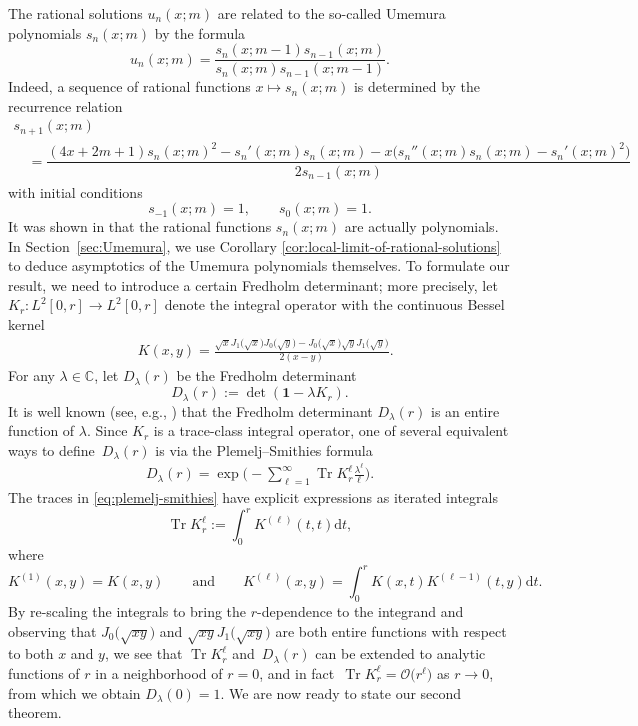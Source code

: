 \documentclass[pdftex]{sigma}
\numberwithin{equation}{section}
\newcommand{\dd}{\mathrm{d}}
\newcommand\lb{\left(}
\newcommand\rb{\right)}
\newcommand{\Tr}{\operatorname{Tr}}
\begin{document}
The rational solutions $u_n(x;m)$ are related to the so-called Umemura polynomials $s_n(x;m)$ by the formula
\begin{equation}
u_n(x;m)=\dfrac{s_n(x;m-1)s_{n-1}(x;m)}{s_n(x;m)s_{n-1}(x;m-1)}.
\label{eq:un-polys}
\end{equation}
Indeed, a sequence of rational functions $x\mapsto s_n(x;m)$ is determined by the recurrence relation
\begin{gather}
s_{n+1}(x;m)\nonumber\\
\quad=\dfrac{(4x+2m+1)s_n(x;m)^2-s_n'(x;m)s_n(x;m)-x\big(s_n''(x;m)s_n(x;m)-s_n'(x;m)^2\big)}{2s_{n-1}(x;m)}
\label{eq:umemura-recurrence}
\end{gather}
with initial conditions
\begin{equation}\label{eq:umemura-recurrence_init}
s_{-1}(x;m)=1,\qquad s_{0}(x;m)=1.
\end{equation}
It was shown in \cite{clarkson2018constructive,Umemura} that the rational functions $s_n(x;m)$ are actually polynomials. In Section~\ref{sec:Umemura}, we use Corollary \ref{cor:local-limit-of-rational-solutions} to deduce asymptotics of the Umemura polynomials themselves. To formulate our result, we need to introduce a certain Fredholm determinant; more precisely, let $K_r\colon L^2[0, r] \to L^2[0, r]$ denote the integral operator with the continuous Bessel kernel
 	\begin{align*}
 	&K(x,y)=\frac{\sqrt{x}J_1\big( \sqrt x\big) J_0\big(\sqrt y\big)-
 	 J_0\big(\sqrt x\big) \sqrt{y}J_1\big( \sqrt y\big)}{2( x-y)}.
 	\end{align*}
For any $\lambda\in\mathbb C$, let $D_\lambda( r)$ be the Fredholm determinant
\[%
 	D_\lambda( r) :=\det ( \mathbf 1-\lambda K_r).
\]
It is well known (see, e.g., \cite[Chapter 24]{Lax}) that the Fredholm determinant $D_\lambda( r)$ is an entire function of $\lambda$. Since $K_r$ is a trace-class integral operator, one of several equivalent ways to define~$D_\lambda\lb r\rb$ is via the Plemelj--Smithies formula
 \begin{gather}
 D_\lambda( r)=\exp\biggl(-\sum_{\ell=1}^\infty \Tr K_r^{\ell} \frac{\lambda^\ell}{\ell}\biggr).
 \label{eq:plemelj-smithies}
 \end{gather}
The traces in \eqref{eq:plemelj-smithies} have explicit expressions as iterated integrals
\[
\Tr K_r^\ell := \int_0^r K^{(\ell)}(t, t) \dd t,
\]
where
\[
K^{(1)}(x, y) = K(x, y) \qquad \text{and} \qquad K^{(\ell)}(x, y) = \int_0^r K(x, t) K^{(\ell - 1)}(t, y) \dd t.
\]
By re-scaling the integrals to bring the $r$-dependence to the integrand and observing that $J_0 \big( \sqrt{xy} \big)$ and $\sqrt{xy}J_1\big(\sqrt{xy}\big)$ are both entire functions with respect to both $x$ and $y$, we see that $\Tr K_r^{\ell}$ and~$D_\lambda ( r)$ can be extended to analytic functions of $r$ in a neighborhood of $r=0$, and in fact~$\Tr K_r^{\ell}=\mathcal{O}\big(r^\ell\big)$ as $r\to 0$, from which we obtain $D_\lambda(0)=1$. We are now ready to state our second theorem.
\end{document}

